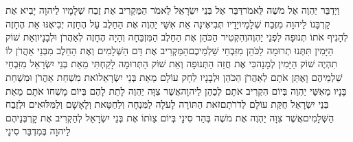 \documentclass[../main/main.tex]{subfiles}
\begin{document}
\begin{multicols*}{\ncols}
וַיְדַבֵּר יַהְוֶה אֶל מֹשֶׁה לֵּאמֹר\PreVerseSpace{}דַּבֵּר אֶל בְּנֵי יִשְׂרָאֵל לֵאמֹר הַמַּקְרִיב אֶת זֶבַח שְׁלָמָיו לַיהוָה יָבִיא אֶת קָרְבָּנוֹ לַיהוָה מִזֶּבַח שְׁלָמָיו\PreVerseSpace{}יָדָיו תְּבִיאֶינָה אֵת אִשֵּׁי יַהְוֶה אֶת הַחֵלֶב עַל הֶחָזֶה יְבִיאֶנּוּ אֵת הֶחָזֶה לְהָנִיף אֹתוֹ תְּנוּפָה לִפְנֵי יַהְוֶה\PreVerseSpace{}וְהִקְטִיר הַכֹּהֵן אֶת הַחֵלֶב הַמִּזְבֵּחָה וְהָיָה הֶחָזֶה לְאַהֲרֹן וּלְבָנָיו\PreVerseSpace{}וְאֵת שׁוֹק הַיָּמִין תִּתְּנוּ תְרוּמָה לַכֹּהֵן מִזִּבְחֵי שַׁלְמֵיכֶם\PreVerseSpace{}הַמַּקְרִיב אֶת דַּם הַשְּׁלָמִים וְאֶת הַחֵלֶב מִבְּנֵי אַהֲרֹן לוֹ תִהְיֶה שׁוֹק הַיָּמִין לְמָנָה\PreVerseSpace{}כִּי אֶת חֲזֵה הַתְּנוּפָה וְאֵת שׁוֹק הַתְּרוּמָה לָקַחְתִּי מֵאֵת בְּנֵי יִשְׂרָאֵל מִזִּבְחֵי שַׁלְמֵיהֶם וָאֶתֵּן אֹתָם לְאַהֲרֹן הַכֹּהֵן וּלְבָנָיו לְחָק עוֹלָם מֵאֵת בְּנֵי יִשְׂרָאֵל\PreVerseSpace{}זֹאת מִשְׁחַת אַהֲרֹן וּמִשְׁחַת בָּנָיו מֵאִשֵּׁי יַהְוֶה בְּיוֹם הִקְרִיב אֹתָם לְכַהֵן לַיהוָה\PreVerseSpace{}אֲשֶׁר צִוָּה יַהְוֶה לָתֵת לָהֶם בְּיוֹם מָשְׁחוֹ אֹתָם מֵאֵת בְּנֵי יִשְׂרָאֵל חֻקַּת עוֹלָם לְדֹרֹתָם\PreVerseSpace{}זֹאת הַתּוֹרָה לָעֹלָה לַמִּנְחָה וְלַחַטָּאת וְלָאָשָׁם וְלַמִּלּוּאִים וּלְזֶבַח הַשְּׁלָמִים\PreVerseSpace{}אֲשֶׁר צִוָּה יַהְוֶה אֶת מֹשֶׁה בְּהַר סִינָי בְּיוֹם צַוֺּתוֹ אֶת בְּנֵי יִשְׂרָאֵל לְהַקְרִיב אֶת קָרְבְּנֵיהֶם לַיהוָה בְּמִדְבַּר סִינָי\OpenSection{}\par

\end{multicols*}
\end{document}
